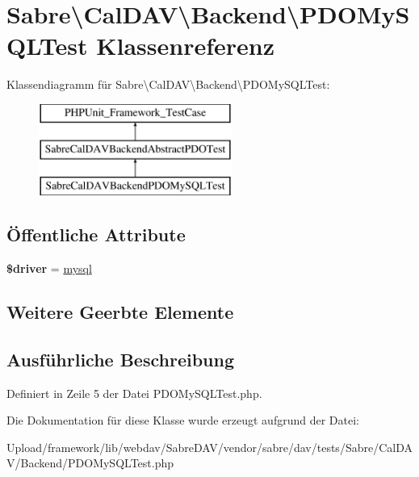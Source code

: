 \hypertarget{class_sabre_1_1_cal_d_a_v_1_1_backend_1_1_p_d_o_my_s_q_l_test}{}\section{Sabre\textbackslash{}Cal\+D\+AV\textbackslash{}Backend\textbackslash{}P\+D\+O\+My\+S\+Q\+L\+Test Klassenreferenz}
\label{class_sabre_1_1_cal_d_a_v_1_1_backend_1_1_p_d_o_my_s_q_l_test}
Klassendiagramm für Sabre\textbackslash{}Cal\+D\+AV\textbackslash{}Backend\textbackslash{}P\+D\+O\+My\+S\+Q\+L\+Test\+:\begin{figure}[H]
\begin{center}
\leavevmode
\includegraphics[height=3.000000cm]{class_sabre_1_1_cal_d_a_v_1_1_backend_1_1_p_d_o_my_s_q_l_test}
\end{center}
\end{figure}
\subsection*{Öffentliche Attribute}
\begin{DoxyCompactItemize}
\item 
\mbox{\label{class_sabre_1_1_cal_d_a_v_1_1_backend_1_1_p_d_o_my_s_q_l_test_acf4c73dd4ff6ceaeb1d4677261f00dc4}} 
{\bfseries \$driver} = \textquotesingle{}\mbox{\hyperlink{classmysql}{mysql}}\textquotesingle{}
\end{DoxyCompactItemize}
\subsection*{Weitere Geerbte Elemente}


\subsection{Ausführliche Beschreibung}


Definiert in Zeile 5 der Datei P\+D\+O\+My\+S\+Q\+L\+Test.\+php.



Die Dokumentation für diese Klasse wurde erzeugt aufgrund der Datei\+:\begin{DoxyCompactItemize}
\item 
Upload/framework/lib/webdav/\+Sabre\+D\+A\+V/vendor/sabre/dav/tests/\+Sabre/\+Cal\+D\+A\+V/\+Backend/P\+D\+O\+My\+S\+Q\+L\+Test.\+php\end{DoxyCompactItemize}
